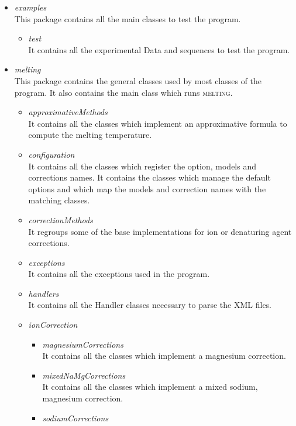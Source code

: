 \documentclass{article}
\begin{document}
\begin{itemize}
  \item \textit{examples} \\
  This package contains all the main classes to test the program.
    \begin{itemize}
    \item \textit{test} \\
    It contains all the experimental Data and sequences to test the program.
    \end{itemize}
  \item \textit{melting} \\
  This package contains the general classes used by most classes of the program. It also
  contains the main class which runs \textsc{melting}.
    \begin{itemize}
    \item \textit{approximativeMethods} \\
    It contains all the classes which implement an approximative formula to compute the melting
    temperature.
    \item \textit{configuration} \\
    It contains all the classes which register the option, models and corrections names. It contains
    the classes which manage the default options and which map the models and correction names with the
    matching classes.
    \item \textit{correctionMethods} \\
    It regroups some of the base implementations for ion or denaturing agent corrections.
    \item \textit{exceptions} \\
    It contains all the exceptions used in the program.
    \item \textit{handlers} \\
    It contains all the Handler classes necessary to parse the XML files.
    \item \textit{ionCorrection} \\
      \begin{itemize}
      \item \textit{magnesiumCorrections} \\
      It contains all the classes which implement a magnesium correction.
      \item \textit{mixedNaMgCorrections} \\
      It contains all the classes which implement a mixed sodium, magnesium correction.
      \item \textit{sodiumCorrections} \\

\end{itemize}
\end{itemize}
\end{itemize}
\end{document}
